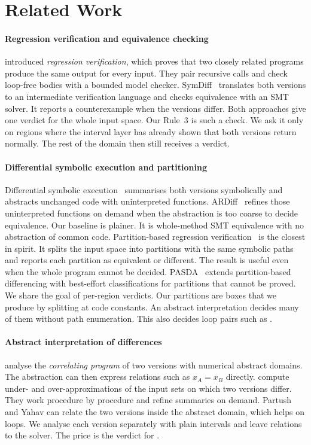 \section{Related Work}
\label{sec:related}

\paragraph{Regression verification and equivalence checking}
\citet{godlin2009regression} introduced \emph{regression verification}, which proves that two
closely related programs produce the same output for every input. They pair recursive calls
and check loop-free bodies with a bounded model checker. SymDiff~\citep{lahiri2012symdiff}
translates both versions to an intermediate verification language and checks equivalence with
an SMT solver. It reports a counterexample when the versions differ. Both approaches give one
verdict for the whole input space. Our Rule~3 is such a check. We ask it only on regions where
the interval layer has already shown that both versions return normally. The rest of the
domain then still receives a verdict.

\paragraph{Differential symbolic execution and partitioning}
Differential symbolic execution~\citep{person2008dse} summarises both versions symbolically
and abstracts unchanged code with uninterpreted functions. ARDiff~\citep{badihi2020ardiff}
refines those uninterpreted functions on demand when the abstraction is too coarse to decide
equivalence. Our  baseline is plainer. It is whole-method SMT equivalence with no
abstraction of common code. Partition-based regression verification~\citep{boehme2013prv} is
the closest in spirit. It splits the input space into partitions with the same symbolic paths
and reports each partition as equivalent or different. The result is useful even when the
whole program cannot be decided. PASDA~\citep{glock2024pasda} extends partition-based
differencing with best-effort classifications for partitions that cannot be proved. We share
the goal of per-region verdicts. Our partitions are boxes that we produce by splitting at code
constants. An abstract interpretation decides many of them without path enumeration. This also
decides loop pairs such as .

\paragraph{Abstract interpretation of differences}
\citet{partush2013abstract} analyse the \emph{correlating program} of two versions with
numerical abstract domains. The abstraction can then express relations such as $x_A = x_B$
directly. \citet{trostanetski2017modular} compute under- and over-approximations of the input
sets on which two versions differ. They work procedure by procedure and refine summaries on
demand. Partush and Yahav can relate the two versions inside the abstract domain, which helps
on loops. We analyse each version separately with plain intervals and leave relations to the
solver. The price is the \unk{} verdict for .


